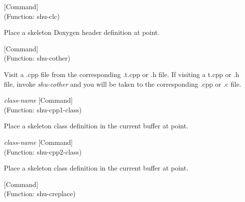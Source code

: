 \vspace{1em}
\noindent
{}
\usebox{\funcname}
 \hfill [Command]\\%
 (Function: shu-clc)

\begin{doc-string}
Place a skeleton Doxygen header definition at point.
\end{doc-string}

\vspace{1em}
\noindent
{}
\usebox{\funcname}
 \hfill [Command]\\%
 (Function: shu-cother)

\begin{doc-string}
Visit a .cpp file from the corresponding .t.cpp or .h file.  If visiting a t.cpp or .h
file, invoke \emph{shu-cother} and you will be taken to the corresponding .cpp or .c file.
\end{doc-string}

\vspace{1em}
\noindent
{}
\usebox{\funcname}\emph{class-name}
 \hfill [Command]\\%
 (Function: shu-cpp1-class)

\begin{doc-string}
Place a skeleton class definition in the current buffer at point.
\end{doc-string}

\vspace{1em}
\noindent
{}
\usebox{\funcname}\emph{class-name}
 \hfill [Command]\\%
 (Function: shu-cpp2-class)

\begin{doc-string}
Place a skeleton class definition in the current buffer at point.
\end{doc-string}

\vspace{1em}
\noindent
{}
\usebox{\funcname}
 \hfill [Command]\\%
 (Function: shu-creplace)


